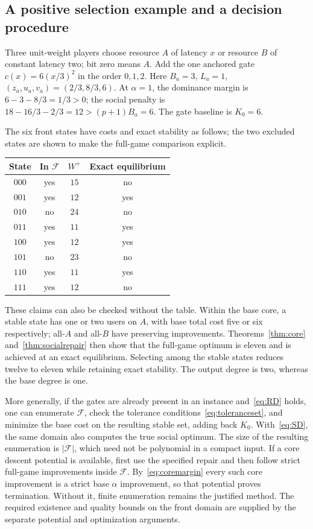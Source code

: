 \documentclass[manuscript,review,anonymous]{acmart}
\newcommand{\F}{\mathcal F}
\begin{document}
\subsection{A positive selection example and a decision procedure}
Three unit-weight players choose resource $A$ of latency $x$ or resource $B$ of constant latency two; bit zero means $A$. Add the one anchored gate $c(x)=6(x/3)^2$ in the order $0,1,2$. Here $B_a=3$, $L_a=1$, $(z_a,u_a,v_a)=(2/3,8/3,6)$. At $\alpha=1$, the dominance margin is $6-3-8/3=1/3>0$; the social penalty is $18-16/3-2/3=12>(p+1)B_a=6$. The gate baseline is $K_0=6$.

The six front states have costs and exact stability as follows; the two excluded states are shown to make the full-game comparison explicit.
\begin{center}
\begin{tabular}{cccc}
\toprule
State & In $\F$ & $W^+$ & Exact equilibrium\\
\midrule
$000$ & yes & $15$ & no\\
$001$ & yes & $12$ & yes\\
$010$ & no & $24$ & no\\
$011$ & yes & $11$ & yes\\
$100$ & yes & $12$ & yes\\
$101$ & no & $23$ & no\\
$110$ & yes & $11$ & yes\\
$111$ & yes & $12$ & no\\
\bottomrule
\end{tabular}
\end{center}
These claims can also be checked without the table. Within the base core, a stable state has one or two users on $A$, with base total cost five or six respectively; all-$A$ and all-$B$ have preserving improvements. Theorems~\ref{thm:core} and~\ref{thm:socialrepair} then show that the full-game optimum is eleven and is achieved at an exact equilibrium. Selecting among the stable states reduces twelve to eleven while retaining exact stability. The output degree is two, whereas the base degree is one.

More generally, if the gates are already present in an instance and~\eqref{eq:RD} holds, one can enumerate $\F$, check the tolerance conditions~\eqref{eq:toleranceset}, and minimize the base cost on the resulting stable set, adding back $K_0$. With~\eqref{eq:SD}, the same domain also computes the true social optimum. The size of the resulting enumeration is $|\F|$, which need not be polynomial in a compact input. If a core descent potential is available, first use the specified repair and then follow strict full-game improvements inside $\F$. By~\eqref{eq:coremargin} every such core improvement is a strict base $\alpha$ improvement, so that potential proves termination. Without it, finite enumeration remains the justified method. The required existence and quality bounds on the front domain are supplied by the separate potential and optimization arguments.
\end{document}
